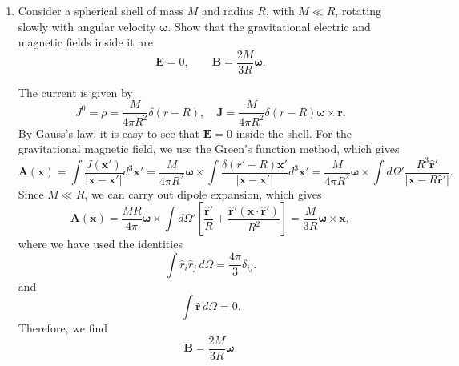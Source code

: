 \begin{enumerate}[label=\alph*)]
    \item Consider a spherical shell of mass $M$ and radius $R$, with $M\ll R$,
    rotating slowly with angular velocity $\boldsymbol\omega$. Show that the
    gravitational electric and magnetic fields inside it are
    \begin{equation}
        \mathbf E=0,
        \qquad
        \mathbf B=\frac{2M}{3R}\boldsymbol\omega.
    \end{equation}
    \begin{solution}
        The current is given by
        \begin{equation}
            J^0 = \rho = \frac{M}{4\pi R^2}\delta(r-R), \quad \mathbf{J} = \frac{M}{4\pi R^2}\delta(r-R)\boldsymbol{\omega}\times\mathbf{r}.
        \end{equation}
        By Gauss's law, it is easy to see that $\mathbf{E} = 0$ inside the shell. For the gravitational magnetic field, we use the Green's function method, which gives
        \begin{equation}
            \mathbf{A}(\mathbf{x}) = \int \frac{J(\mathbf{x}')}{{|\mathbf{x}- \mathbf{x}'|}} d^3\mathbf{x}' = \frac{M}{4\pi R^2}\boldsymbol{\omega}\times\int \frac{\delta(r'-R) \mathbf{x}'}{|\mathbf{x}- \mathbf{x}'|}d^3\mathbf{x}' = \frac{M}{4\pi R^2}\boldsymbol{\omega}\times\int d\Omega'\frac{R^3\hat{\mathbf{r}}'}{|\mathbf{x} - R \hat{\mathbf{r}}'|}.
        \end{equation}
        Since $M \ll R$, we can carry out dipole expansion, which gives
        \begin{equation}
            \mathbf{A}(\mathbf{x})= \frac{MR}{4\pi}\boldsymbol{\omega}\times\int d\Omega'\left[\frac{\hat{\mathbf{r}}'}{R} + \frac{\hat{\mathbf{r}}'(\mathbf{x}\cdot \hat{\mathbf{r}}')}{R^2}\right] = \frac{M}{3R}\boldsymbol{\omega}\times\mathbf{x},
        \end{equation}
        where we have used the identities
        \[
\int \hat r_i\hat r_j\,d\Omega
=
\frac{4\pi}{3}\delta_{ij}.
\] and \[
\int \hat{\mathbf r}\,d\Omega=0.
\]
        Therefore, we find
        \begin{equation}
            \mathbf{B} = \frac{2M}{3R}\boldsymbol{\omega}.
        \end{equation}
    \end{solution}


\end{enumerate}
